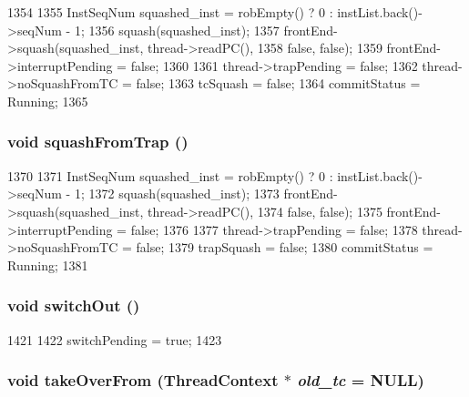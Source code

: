 \begin{DoxyCode}
1354 {
1355     InstSeqNum squashed_inst = robEmpty() ? 0 : instList.back()->seqNum - 1;
1356     squash(squashed_inst);
1357     frontEnd->squash(squashed_inst, thread->readPC(),
1358                      false, false);
1359     frontEnd->interruptPending = false;
1360 
1361     thread->trapPending = false;
1362     thread->noSquashFromTC = false;
1363     tcSquash = false;
1364     commitStatus = Running;
1365 }
\end{DoxyCode}
\hypertarget{classLWBackEnd_a63c6cc9b9d0507c286d035e92a1bc4f4}{
\subsubsection[{squashFromTrap}]{\setlength{\rightskip}{0pt plus 5cm}void squashFromTrap ()}}
\label{classLWBackEnd_a63c6cc9b9d0507c286d035e92a1bc4f4}



\begin{DoxyCode}
1370 {
1371     InstSeqNum squashed_inst = robEmpty() ? 0 : instList.back()->seqNum - 1;
1372     squash(squashed_inst);
1373     frontEnd->squash(squashed_inst, thread->readPC(),
1374                      false, false);
1375     frontEnd->interruptPending = false;
1376 
1377     thread->trapPending = false;
1378     thread->noSquashFromTC = false;
1379     trapSquash = false;
1380     commitStatus = Running;
1381 }
\end{DoxyCode}
\hypertarget{classLWBackEnd_a05f299b443f8cc73a93d61572edc0218}{
\subsubsection[{switchOut}]{\setlength{\rightskip}{0pt plus 5cm}void switchOut ()}}
\label{classLWBackEnd_a05f299b443f8cc73a93d61572edc0218}



\begin{DoxyCode}
1421 {
1422     switchPending = true;
1423 }
\end{DoxyCode}
\hypertarget{classLWBackEnd_a5a901e7ec5b94a55bd61fde88ad0b7f1}{
\subsubsection[{takeOverFrom}]{\setlength{\rightskip}{0pt plus 5cm}void takeOverFrom ({\bf ThreadContext} $\ast$ {\em old\_\-tc} = {\ttfamily NULL})}}
\label{classLWBackEnd_a5a901e7ec5b94a55bd61fde88ad0b7f1}



